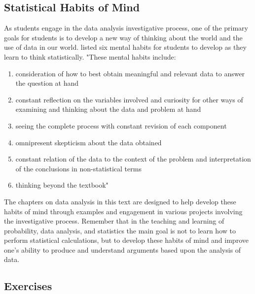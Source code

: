 \documentclass[
]{book}
\providecommand{\tightlist}{%
  \setlength{\itemsep}{0pt}\setlength{\parskip}{0pt}}
\theoremstyle{definition}
\theoremstyle{definition}
\theoremstyle{definition}
\theoremstyle{definition}
\theoremstyle{remark}
\begin{document}
\hypertarget{statistical-habits-of-mind}{%
\subsection{Statistical Habits of Mind}\label{statistical-habits-of-mind}}

As students engage in the data analysis investigative process, one of the primary goals for students is to develop a new way of thinking about the world and the use of data in our world. \citet{Chance2002} listed six mental habits for students to develop as they learn to think statistically. "These mental habits include:

\begin{enumerate}
\def\labelenumi{\arabic{enumi}.}
\tightlist
\item
  consideration of how to best obtain meaningful and relevant data to answer the question at hand
\item
  constant reflection on the variables involved and curiosity for other ways of examining and thinking about the data and problem at hand
\item
  seeing the complete process with constant revision of each component
\item
  omnipresent skepticism about the data obtained
\item
  constant relation of the data to the context of the problem and interpretation of the conclusions in non-statistical terms
\item
  thinking beyond the textbook"
\end{enumerate}

The chapters on data analysis in this text are designed to help develop these habits of mind through examples and engagement in various projects involving the investigative process. Remember that in the teaching and learning of probability, data analysis, and statistics the main goal is not to learn how to perform statistical calculations, but to develop these habits of mind and improve one's ability to produce and understand arguments based upon the analysis of data.

\hypertarget{exercises-59}{%
\subsection{Exercises}\label{exercises-59}}
\end{document}

